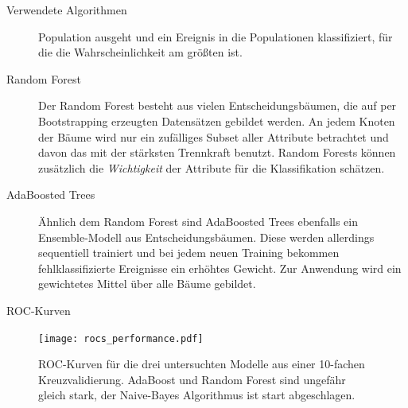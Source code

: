 \documentclass[t]{beamer}
\begin{document}
\begin{columns}[onlytextwidth]
\begin{column}{0.5\textwidth}
\begin{block}{Verwendete Algorithmen}
\begin{description}
            Population ausgeht und ein Ereignis in die Populationen klassifiziert, für
            die die Wahrscheinlichkeit am größten ist.
          \item[Random Forest] Der Random Forest \cite{rf} besteht aus vielen Entscheidungsbäumen,
            die auf per Bootstrapping erzeugten Datensätzen gebildet werden.
            An jedem Knoten der Bäume wird nur ein zufälliges Subset aller Attribute betrachtet und davon das mit der
            stärksten Trennkraft benutzt.
            Random Forests können zusätzlich die \emph{Wichtigkeit} der Attribute für die Klassifikation
            schätzen.
          \item[AdaBoosted Trees] Ähnlich dem Random Forest sind AdaBoosted Trees \cite{adaboost}
            ebenfalls ein Ensemble-Modell aus Entscheidungsbäumen.
            Diese werden allerdings sequentiell trainiert und bei jedem neuen
            Training bekommen fehlklassifizierte Ereignisse ein erhöhtes Gewicht.
            Zur Anwendung wird ein gewichtetes Mittel über alle Bäume gebildet.
        \end{description}
      \end{block}
      \begin{block}{ROC-Kurven}
        \begin{multicols}{2}
          \begin{figure}
            \centering
            \texttt{[image: rocs\_performance.pdf]}
            \caption{ROC-Kurven für die drei untersuchten Modelle aus einer 10-fachen
            Kreuzvalidierung. AdaBoost und Random Forest sind ungefähr gleich stark,
          der Naive-Bayes Algorithmus ist start abgeschlagen.}
            \label{fig:name}
          \end{figure}
          \begin{center}
            
          \end{center}
        \end{multicols}
      \end{block}


\end{column}
\end{columns}
\end{document}
